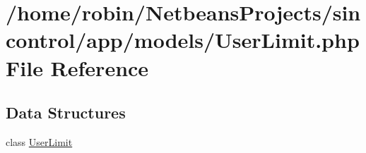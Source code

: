 \hypertarget{_user_limit_8php}{}\section{/home/robin/\+Netbeans\+Projects/sincontrol/app/models/\+User\+Limit.php File Reference}
\label{_user_limit_8php}
\subsection*{Data Structures}
\begin{DoxyCompactItemize}
\item 
class \hyperlink{class_user_limit}{User\+Limit}
\end{DoxyCompactItemize}
